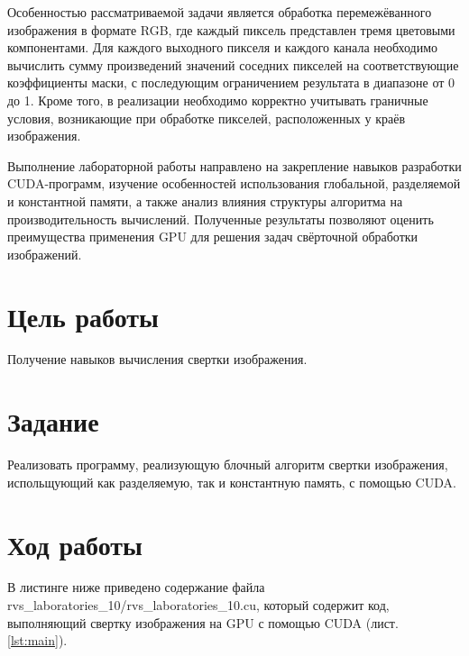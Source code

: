 \documentclass[14pt]{extarticle}
\makeatletter
\newcommand{\numbersections}{\renewcommand{\Hy@numberline}[1]{##1~}}
\let\oldsection\section
\renewcommand{\section}{\numbersections\oldsection}
\makeatother
\begin{document}
Особенностью рассматриваемой задачи является обработка перемежёванного изображения в формате RGB, где каждый пиксель представлен тремя цветовыми компонентами. Для каждого выходного пикселя и каждого канала необходимо вычислить сумму произведений значений соседних пикселей на соответствующие коэффициенты маски, с последующим ограничением результата в диапазоне от 0 до 1. Кроме того, в реализации необходимо корректно учитывать граничные условия, возникающие при обработке пикселей, расположенных у краёв изображения.

Выполнение лабораторной работы направлено на закрепление навыков разработки CUDA-программ, изучение особенностей использования глобальной, разделяемой и константной памяти, а также анализ влияния структуры алгоритма на производительность вычислений. Полученные результаты позволяют оценить преимущества применения GPU для решения задач свёрточной обработки изображений.

\section{Цель работы}

Получение навыков вычисления свертки изображения.

\section{Задание}

Реализовать программу, реализующую блочный алгоритм свертки изображения, испольщующий как разделяемую, так и константную память, с помощью CUDA.

\section{Ход работы}

В листинге ниже приведено содержание файла rvs\_lab\-oratories\_10/rvs\_lab\-oratories\_10.cu, который содержит код, выполняющий свертку изображения на GPU с помощью CUDA (лист. \ref{lst:main}).
\end{document}

